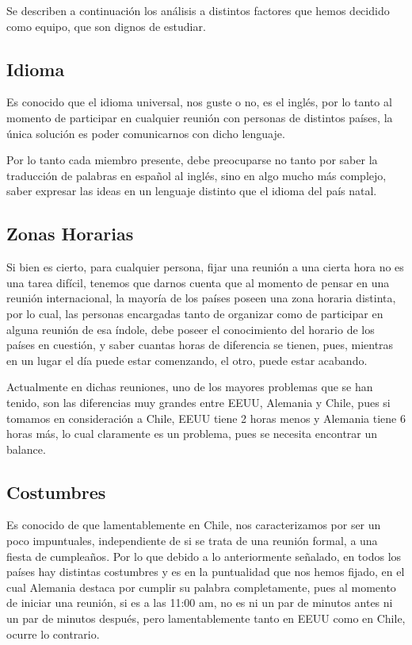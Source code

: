 Se describen a continuación los análisis a distintos factores que hemos
decidido como equipo, que son dignos de estudiar.

\subsection{Idioma}
Es conocido que el idioma universal, nos guste o no,
es el inglés, por lo tanto al momento de participar en
cualquier reunión con personas de distintos países,
la única solución es poder comunicarnos con dicho lenguaje.

Por lo tanto cada miembro presente, debe preocuparse no tanto
por saber la traducción de palabras en español al inglés,
sino en algo mucho más complejo, saber expresar las ideas
en un lenguaje distinto que el idioma del país natal.


\subsection{Zonas Horarias}
Si bien es cierto, para cualquier persona, fijar una reunión
a una cierta hora no es una tarea difícil, tenemos que darnos
cuenta que al momento de pensar en una reunión internacional,
la mayoría de los países poseen una zona horaria distinta, por
lo cual, las personas encargadas tanto de organizar como de
participar en alguna reunión de esa índole, debe poseer el
conocimiento del horario de los países en cuestión,
y saber cuantas horas de diferencia se tienen, pues, mientras
en un lugar el día puede estar comenzando, el otro, puede estar
acabando.

Actualmente en dichas reuniones, uno de los mayores problemas
que se han tenido, son las diferencias muy grandes entre EEUU, 
Alemania y Chile, pues si tomamos en consideración a Chile,
EEUU tiene 2 horas menos y Alemania tiene 6 horas más, lo cual
claramente es un problema, pues se necesita encontrar un balance.

\subsection{Costumbres}
Es conocido de que lamentablemente en Chile, nos caracterizamos
por ser un poco impuntuales, independiente de si se trata de una
reunión formal, a una fiesta de cumpleaños. Por lo que debido a lo
anteriormente señalado, en todos los países hay distintas costumbres
y es en la puntualidad que nos hemos fijado, en el cual Alemania
destaca por cumplir su palabra completamente, pues al momento
de iniciar una reunión, si es a las 11:00 am, no es ni un par
de minutos antes ni un par de minutos después, pero lamentablemente
tanto en EEUU como en Chile, ocurre lo contrario.

